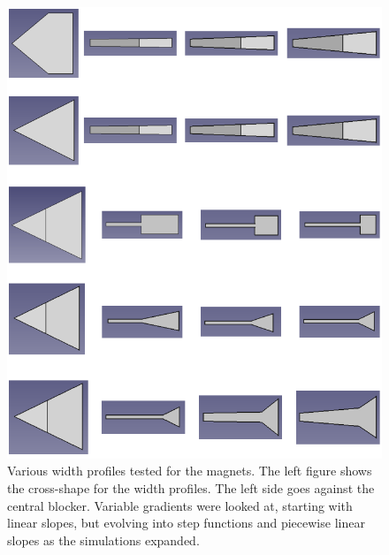 \begin{figure}
    \centering
    \includegraphics[scale=0.8]{Future_Figs/Width-Shape.png}
    \caption{Various width profiles tested for the magnets. The left figure shows the cross-shape for the width profiles. The left side goes against the central blocker. Variable gradients were looked at, starting with linear slopes, but evolving into step functions and piecewise linear slopes as the simulations expanded.}
    \label{fig:width_shape}
\end{figure}